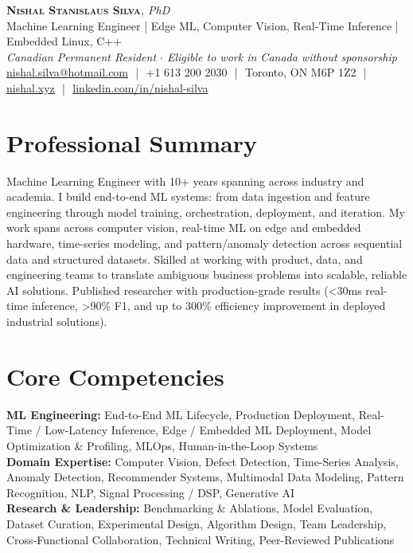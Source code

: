 \documentclass[11pt]{article}
\begin{document}
\pagestyle{empty}
\begin{center}
    {\LARGE \scshape \textbf{Nishal Stanislaus Silva}}{\large \textit{, PhD}}
    \\[1pt]
    {\small Machine Learning Engineer | Edge ML, Computer Vision, Real-Time Inference | Embedded Linux, C++}
    \\[1pt]
    {\footnotesize\textit{Canadian Permanent Resident $\cdot$ Eligible to work in Canada without sponsorship}}
    \\[1pt]
    {\small \href{mailto:nishal.silva@hotmail.com}{nishal.silva@hotmail.com}
    \,\,|\,\, +1 613 200 2030
    \,\,|\,\, Toronto, ON M6P 1Z2
    \,\,|\,\, \href{https://nishal.xyz}{nishal.xyz}
    \,\,|\,\, \href{https://www.linkedin.com/in/nishal-silva}{linkedin.com/in/nishal-silva}}
\end{center}

\section*{Professional Summary}
Machine Learning Engineer with 10+ years spanning across industry and academia. I build end-to-end ML systems: from data ingestion and feature engineering through model training, orchestration, deployment, and iteration. My work spans across computer vision, real-time ML on edge and embedded hardware, time-series modeling, and pattern/anomaly detection across sequential data and structured datasets. Skilled at working with product, data, and engineering teams to translate ambiguous business problems into scalable, reliable AI solutions. Published researcher with production-grade results (<30ms real-time inference, >90\% F1, and up to 300\% efficiency improvement in deployed industrial solutions).

\section*{Core Competencies}
\textbf{ML Engineering:} End-to-End ML Lifecycle, Production Deployment, Real-Time / Low-Latency Inference, Edge / Embedded ML Deployment, Model Optimization \& Profiling, MLOps, Human-in-the-Loop Systems\\
\textbf{Domain Expertise:} Computer Vision, Defect Detection, Time-Series Analysis, Anomaly Detection, Recommender Systems, Multimodal Data Modeling, Pattern Recognition, NLP, Signal Processing / DSP, Generative AI\\
\textbf{Research \& Leadership:} Benchmarking \& Ablations, Model Evaluation, Dataset Curation, Experimental Design, Algorithm Design, Team Leadership, Cross-Functional Collaboration, Technical Writing, Peer-Reviewed Publications
\end{document}
